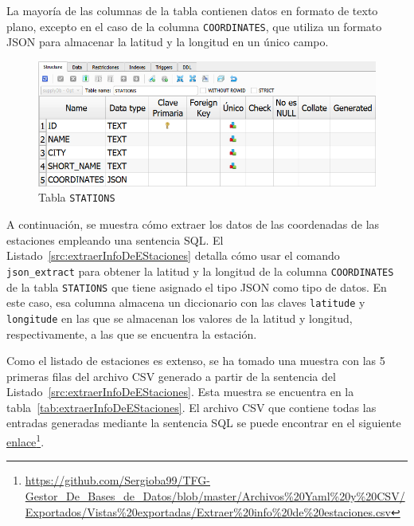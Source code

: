 La mayoría de las columnas de la tabla contienen datos en formato de texto plano, excepto en el caso de la columna \texttt{COORDINATES}, que utiliza un formato \acrfull{JSON} para almacenar la latitud y la longitud en un único campo.

\begin{figure}[H]
\centering
\includegraphics[width=.9\textwidth]{fig/Tablas base de datos/Oferta/STATIONS.png}
\caption{Tabla \texttt{STATIONS}}
\label{fig:dbSupplySTATIONS}
\end{figure}

A continuación, se muestra cómo extraer los datos de las coordenadas de las estaciones empleando una sentencia \acrshort{SQL}. El Listado~\ref{src:extraerInfoDeEStaciones} detalla cómo usar el comando \texttt{json\_extract} para obtener la latitud y la longitud de la columna \texttt{COORDINATES} de la tabla \texttt{STATIONS} que tiene asignado el tipo \acrshort{JSON} como tipo de datos. En este caso, esa columna almacena un diccionario con las claves \texttt{latitude} y \texttt{longitude} en las que se almacenan los valores de la latitud y longitud, respectivamente, a las que se encuentra la estación.



Como el listado de estaciones es extenso, se ha tomado una muestra con las 5 primeras filas del archivo \acrshort{CSV} generado a partir de la sentencia del Listado~\ref{src:extraerInfoDeEStaciones}. Esta muestra se encuentra en la tabla~\ref{tab:extraerInfoDeEStaciones}. El archivo \acrshort{CSV} que contiene todas las entradas generadas mediante la sentencia \acrshort{SQL} se puede encontrar en el siguiente \href{https://github.com/Sergioba99/TFG-Gestor_De_Bases_de_Datos/blob/master/Archivos%20Yaml%20y%20CSV/Exportados/Vistas%20exportadas/Extraer%20info%20de%20estaciones.csv}{enlace}\footnote{\url{https://github.com/Sergioba99/TFG-Gestor\_De\_Bases\_de\_Datos/blob/master/Archivos\%20Yaml\%20y\%20CSV/Exportados/Vistas\%20exportadas/Extraer\%20info\%20de\%20estaciones.csv}}.

